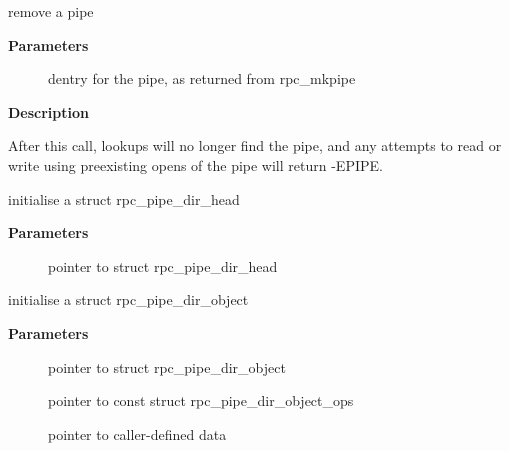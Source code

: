 \documentclass[a4paper,8pt,english]{sphinxmanual}
\begin{document}
\begin{fulllineitems}
\label{networking/kapi:c.rpc_unlink}
remove a pipe

\end{fulllineitems}


\textbf{Parameters}
\begin{description}
\item[{}] \leavevmode
dentry for the pipe, as returned from rpc\_mkpipe

\end{description}

\textbf{Description}

After this call, lookups will no longer find the pipe, and any
attempts to read or write using preexisting opens of the pipe will
return -EPIPE.

\begin{fulllineitems}
\label{networking/kapi:c.rpc_init_pipe_dir_head}
initialise a struct rpc\_pipe\_dir\_head

\end{fulllineitems}


\textbf{Parameters}
\begin{description}
\item[{}] \leavevmode
pointer to struct rpc\_pipe\_dir\_head

\end{description}

\begin{fulllineitems}
\label{networking/kapi:c.rpc_init_pipe_dir_object}
initialise a struct rpc\_pipe\_dir\_object

\end{fulllineitems}


\textbf{Parameters}
\begin{description}
\item[{}] \leavevmode
pointer to struct rpc\_pipe\_dir\_object

\item[{}] \leavevmode
pointer to const struct rpc\_pipe\_dir\_object\_ops

\item[{}] \leavevmode
pointer to caller-defined data

\end{description}
\end{document}
